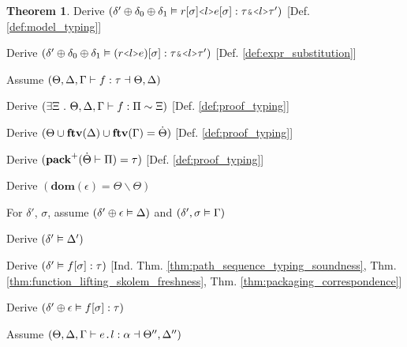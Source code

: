 \documentclass[acmsmall]{acmart}
\theoremstyle{definition}
\newtheorem{theorem}{Theorem}[section]
\begin{document}
\begin{theorem}
  \item \I\I \N Derive $(
    \delta' \oplus \delta_0 \oplus \delta_1 \satisfies r[\sigma]\J{<}l\J{>}e[\sigma] \hastype \tau \J{\&} \J{<}l\J{>}\tau'
  )$ [Def. \ref{def:model_typing}]

  \item \I\I \N Derive $(
    \delta' \oplus \delta_0 \oplus \delta_1 \satisfies (r\J{<}l\J{>}e)[\sigma] \hastype \tau \J{\&} \J{<}l\J{>}\tau'
  )$ [Def. \ref{def:expr_substitution}]


  \item \N Assume $(
    \Theta, \Delta, \Gamma \vdash f : \tau \dashv \Theta, \Delta
  )$

  \item \I \N Derive $(
    \exists \Xi \ .\  \Theta, \Delta, \Gamma \vdash f : \Pi \sim \Xi
  )$ [Def. \ref{def:proof_typing}]

  \item \I \N Derive $(
    \Theta \cup \textbf{ftv}(\Delta) \cup \textbf{ftv}(\Gamma) = \dot{\Theta}
  )$ [Def. \ref{def:proof_typing}]

  \item \I \N Derive $(
    \textbf{pack}^+(\dot{\Theta} \vdash \Pi) = \tau
  )$ [Def. \ref{def:proof_typing}]

  \item \I \N Derive $(
    \textbf{dom}(\epsilon) = \Theta \backslash \Theta
  )$

  \item \I \N For $\delta'$, $\sigma$,
    assume $(\delta' \oplus \epsilon \vDash \Delta)$
    and $(\delta', \sigma \vDash \Gamma)$

  \item \I\I \N Derive $(
    \delta' \vDash \Delta'
  )$

  \item \I\I \N Derive $(
    \delta' \vDash f[\sigma] : \tau
  )$ [Ind. Thm. \ref{thm:path_sequence_typing_soundness}, Thm. \ref{thm:function_lifting_skolem_freshness},
      Thm. \ref{thm:packaging_correspondence}]

  \item \I\I \N Derive $(
    \delta' \oplus \epsilon \vDash f[\sigma] : \tau
  )$ 


  \item \N Assume $(
    \Theta, \Delta, \Gamma \entails e \J{.} l \hastype \alpha \given \Theta'', \Delta''
  )$


\end{theorem}
\end{document}
